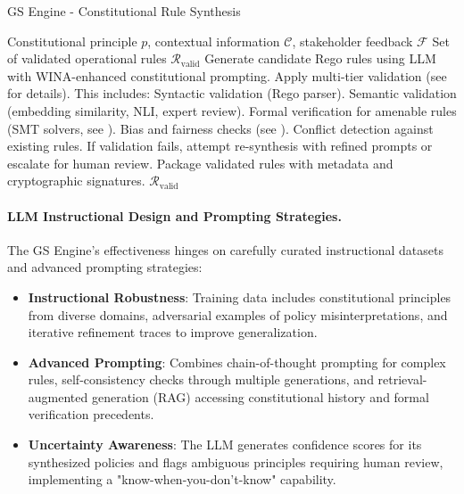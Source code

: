 \documentclass[manuscript,screen,review,anonymous,9pt]{acmart}
\begin{document}
\begin{algorithm}[!htbp]
\caption{GS Engine - Constitutional Rule Synthesis}
\label{alg:gs_engine}
\begin{algorithmic}[1]
\Require Constitutional principle $p$, contextual information $\mathcal{C}$, stakeholder feedback $\mathcal{F}$
\Ensure Set of validated operational rules $\mathcal{R}_{\text{valid}}$
    \State Generate candidate Rego rules using LLM with WINA-enhanced constitutional prompting.
    \State Apply multi-tier validation (see  for details). This includes:
        \State \hspace{\algorithmicindent} Syntactic validation (Rego parser).
        \State \hspace{\algorithmicindent} Semantic validation (embedding similarity, NLI, expert review).
        \State \hspace{\algorithmicindent} Formal verification for amenable rules (SMT solvers, see ).
        \State \hspace{\algorithmicindent} Bias and fairness checks (see ).
        \State \hspace{\algorithmicindent} Conflict detection against existing rules.
    \State If validation fails, attempt re-synthesis with refined prompts or escalate for human review.
    \State Package validated rules with metadata and cryptographic signatures.
    \State \Return $\mathcal{R}_{\text{valid}}$
\EndFunction
\end{algorithmic}
\end{algorithm}

\paragraph{LLM Instructional Design and Prompting Strategies.} The GS Engine's effectiveness hinges on carefully curated instructional datasets and advanced prompting strategies:
\begin{itemize}[leftmargin=*,itemsep=1pt,parsep=1pt]
    \item \textbf{Instructional Robustness}: Training data includes constitutional principles from diverse domains, adversarial examples of policy misinterpretations, and iterative refinement traces to improve generalization.
    \item \textbf{Advanced Prompting}: Combines chain-of-thought prompting for complex rules, self-consistency checks through multiple generations, and retrieval-augmented generation (RAG) accessing constitutional history and formal verification precedents.
    \item \textbf{Uncertainty Awareness}: The LLM generates confidence scores for its synthesized policies and flags ambiguous principles requiring human review, implementing a "know-when-you-don't-know" capability.
\end{itemize}
\end{document}
